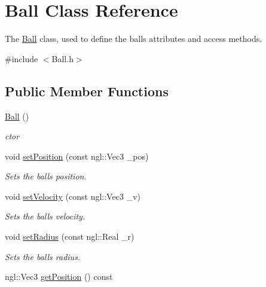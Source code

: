 \hypertarget{class_ball}{}\section{Ball Class Reference}
\label{class_ball}


The \hyperlink{class_ball}{Ball} class, used to define the ball\textquotesingle{}s attributes and access methods.  




{\ttfamily \#include $<$Ball.\+h$>$}

\subsection*{Public Member Functions}
\begin{DoxyCompactItemize}
\item 
\hypertarget{class_ball_a86a144d3dad6c953e422e32435923bbb}{}\hyperlink{class_ball_a86a144d3dad6c953e422e32435923bbb}{Ball} ()\label{class_ball_a86a144d3dad6c953e422e32435923bbb}

\begin{DoxyCompactList}\small\item\em ctor \end{DoxyCompactList}\item 
void \hyperlink{class_ball_a0b2248494bb869c889847fe7110a6b66}{set\+Position} (const ngl\+::\+Vec3 \+\_\+pos)
\begin{DoxyCompactList}\small\item\em Sets the ball\textquotesingle{}s position. \end{DoxyCompactList}\item 
void \hyperlink{class_ball_abf1da28d789d938eac0f8070e8c35514}{set\+Velocity} (const ngl\+::\+Vec3 \+\_\+v)
\begin{DoxyCompactList}\small\item\em Sets the ball\textquotesingle{}s velocity. \end{DoxyCompactList}\item 
void \hyperlink{class_ball_a01f40cdd20529453aeed3c5a62c480bd}{set\+Radius} (const ngl\+::\+Real \+\_\+r)
\begin{DoxyCompactList}\small\item\em Sets the ball\textquotesingle{}s radius. \end{DoxyCompactList}\item 
\hypertarget{class_ball_adcf84d9f9ae674709c7145b289f2c3b9}{}ngl\+::\+Vec3 \hyperlink{class_ball_adcf84d9f9ae674709c7145b289f2c3b9}{get\+Position} () const \label{class_ball_adcf84d9f9ae674709c7145b289f2c3b9}


\end{DoxyCompactItemize}

